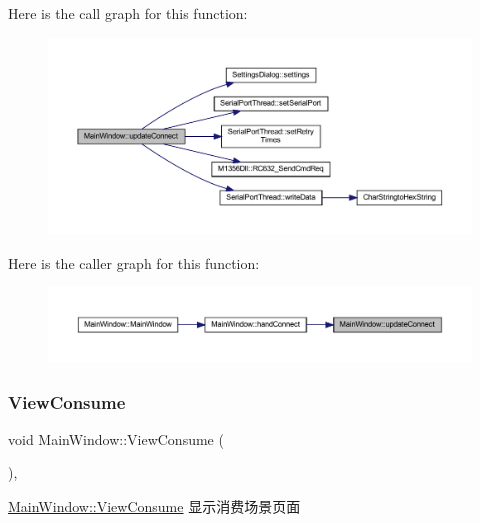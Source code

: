 Here is the call graph for this function\+:
\nopagebreak
\begin{figure}[H]
\begin{center}
\leavevmode
\includegraphics[width=350pt]{class_main_window_a7fddd1ab5d3fcf4454ef1fdfd45f56a7_cgraph}
\end{center}
\end{figure}
Here is the caller graph for this function\+:
\nopagebreak
\begin{figure}[H]
\begin{center}
\leavevmode
\includegraphics[width=350pt]{class_main_window_a7fddd1ab5d3fcf4454ef1fdfd45f56a7_icgraph}
\end{center}
\end{figure}
\mbox{\label{class_main_window_a0d17e2ebc098f3d11f2074378c8aaebc}} 
\subsubsection{\texorpdfstring{ViewConsume}{ViewConsume}}
{\footnotesize\ttfamily void Main\+Window\+::\+View\+Consume (\begin{DoxyParamCaption}{ }\end{DoxyParamCaption})\hspace{0.3cm}{\ttfamily [private]}, {\ttfamily [slot]}}



\mbox{\hyperlink{class_main_window_a0d17e2ebc098f3d11f2074378c8aaebc}{Main\+Window\+::\+View\+Consume}} 显示消费场景页面 

